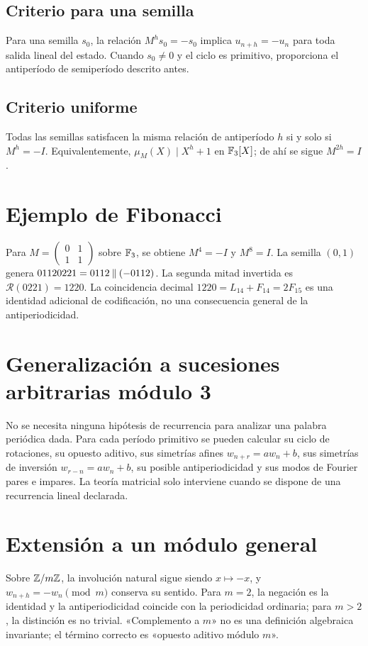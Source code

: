 \documentclass[11pt,a4paper]{article}
\begin{document}
\subsection{Criterio para una semilla}
Para una semilla \(s_0\), la relación \(M^hs_0=-s_0\) implica \(u_{n+h}=-u_n\) para toda salida lineal del estado. Cuando \(s_0\neq0\) y el ciclo es primitivo, proporciona el antiperíodo de semiperíodo descrito antes.
\subsection{Criterio uniforme}
Todas las semillas satisfacen la misma relación de antiperíodo \(h\) si y solo si \(M^h=-I\). Equivalentemente, \(\mu_M(X)\mid X^h+1\) en \(\mathbb F_3[X]\); de ahí se sigue \(M^{2h}=I\).
\section{Ejemplo de Fibonacci}
Para \(M=\begin{pmatrix}0&1\\1&1\end{pmatrix}\) sobre \(\mathbb F_3\), se obtiene \(M^4=-I\) y \(M^8=I\). La semilla \((0,1)\) genera \(01120221=0112\mathbin{\Vert}(-0112)\). La segunda mitad invertida es \(\mathcal R(0221)=1220\). La coincidencia decimal \(1220=L_{14}+F_{14}=2F_{15}\) es una identidad adicional de codificación, no una consecuencia general de la antiperiodicidad.
\section{Generalización a sucesiones arbitrarias módulo 3}
No se necesita ninguna hipótesis de recurrencia para analizar una palabra periódica dada. Para cada período primitivo se pueden calcular su ciclo de rotaciones, su opuesto aditivo, sus simetrías afines \(w_{n+r}=aw_n+b\), sus simetrías de inversión \(w_{r-n}=aw_n+b\), su posible antiperiodicidad y sus modos de Fourier pares e impares. La teoría matricial solo interviene cuando se dispone de una recurrencia lineal declarada.
\section{Extensión a un módulo general}
Sobre \(\mathbb Z/m\mathbb Z\), la involución natural sigue siendo \(x\mapsto-x\), y \(w_{n+h}=-w_n\pmod m\) conserva su sentido. Para \(m=2\), la negación es la identidad y la antiperiodicidad coincide con la periodicidad ordinaria; para \(m>2\), la distinción es no trivial. «Complemento a \(m\)» no es una definición algebraica invariante; el término correcto es «opuesto aditivo módulo \(m\)».
\end{document}
